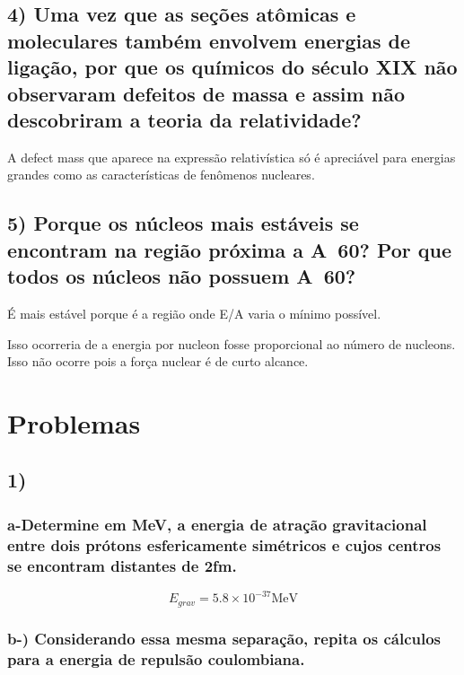 \documentclass{article}
\begin{document}
\subsection*{4) Uma vez que as seções atômicas e moleculares também envolvem energias de ligação, por  que  os  químicos  do  século  XIX  não  observaram  defeitos  de  massa  e  assim  não descobriram a teoria da relatividade?}

A defect mass que aparece na expressão relativística só é apreciável para energias grandes como as características de fenômenos nucleares.

\subsection*{5) Porque os núcleos mais estáveis se encontram na região próxima a A~60? Por que todos os núcleos não possuem A~60?}
É mais estável porque é a região onde E/A varia o mínimo possível. 

Isso ocorreria de a energia por nucleon fosse proporcional ao número de nucleons. Isso não ocorre pois a força nuclear é de curto alcance. 

\pagebreak

\section{Problemas}

\subsection*{1)}
\subsubsection*{a-Determine em MeV, a energia de atração gravitacional entre dois prótons esfericamente simétricos e cujos centros se encontram distantes de 2fm.}

\[E_{grav} = 5.8 \times 10^{-37} \text{MeV}\]

\subsubsection*{b-) Considerando essa mesma separação, repita os cálculos para a energia de repulsão coulombiana.}
\end{document}

